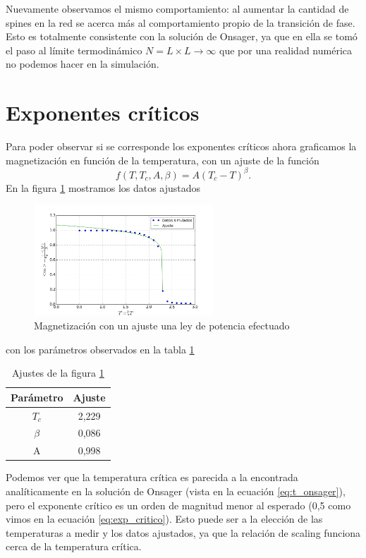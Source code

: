 \documentclass[12pt,a4paper]{article}
\begin{document}
Nuevamente observamos el mismo comportamiento: al aumentar la cantidad de spines en la red se acerca más al comportamiento propio de la transición de fase. Esto es totalmente consistente con la solución de Onsager, ya que en ella se tomó el paso al límite termodinámico $N = L \times L \to \infty$ que por una realidad numérica no podemos hacer en la simulación.

\section{Exponentes críticos}
Para poder observar si se corresponde los exponentes críticos ahora graficamos la magnetización en función de la temperatura, con un ajuste de la función
\[ f(T, T_c, A, \beta) = A (T_c - T)^\beta.\]
En la figura \ref{fig:m_ajuste} mostramos los datos ajustados

\begin{figure}[H]
\centering
\includegraphics[width = 0.6\textwidth]{observables/m_ajuste.png}
\caption{Magnetización con un ajuste una ley de potencia efectuado}
\label{fig:m_ajuste}
\end{figure}

con los parámetros observados en la tabla \ref{tbl:m_ajuste}
\begin{table}[H]
\centering
\begin{tabular}{c|c}
 Parámetro & Ajuste \\\hline
 $T_c$ & 2,229 \\
 $\beta$ & 0,086 \\
 A & 0,998 \\
\end{tabular}
\caption{Ajustes de la figura \ref{fig:m_ajuste}}
\label{tbl:m_ajuste}
\end{table}

Podemos ver que la temperatura crítica es parecida a la encontrada analíticamente en la solución de Onsager (vista en la ecuación \ref{eq:t_onsager}), pero el exponente crítico es un orden de magnitud menor al esperado (0,5 como vimos en la ecuación \ref{eq:exp_critico}). Esto puede ser a la elección de las temperaturas a medir y los datos ajustados, ya que la relación de scaling funciona cerca de la temperatura crítica.
\end{document}
